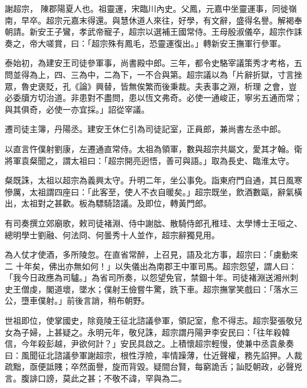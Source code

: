 
\begin{pinyinscope}

 謝超宗，
 陳郡陽夏人也。祖靈運，宋臨川內史。父鳳，元嘉中坐靈運事，同徙嶺南，早卒。超宗元嘉末得還。與慧休道人來往，好學，有文辭，盛得名譽。解褐奉朝請。新安王子鸞，孝武帝寵子，超宗以選補王國常侍。王母殷淑儀卒，超宗作誄奏之，帝大嗟賞，曰：「超宗殊有鳳毛，恐靈運復出。」轉新安王撫軍行參軍。



 泰始初，為建安王司徒參軍事，尚書殿中郎。三年，都令史駱宰議策秀才考格，五問並得為上，四、三為中，二為下，一不合與第。超宗議以為「片辭折獄，寸言挫眾，魯史褒貶，孔《論》興替，皆無俟繁而後秉裁。夫表事之淵，析理
 之會，豈必委牘方切治道。非患對不盡問，患以恆文弗奇。必使一通峻正，寧劣五通而常；與其俱奇，必使一亦宜採。」詔從宰議。



 遷司徒主簿，丹陽丞。建安王休仁引為司徒記室，正員郎，兼尚書左丞中郎。



 以直言忤僕射劉康，左遷通直常侍。太祖為領軍，數與超宗共屬文，愛其才翰。衛將軍袁粲聞之，謂太祖曰：「超宗開亮迥悟，善可與語。」取為長史、臨淮太守。



 粲既誅，太祖以超宗為義興太守。升明二年，坐公事免。詣東府門自通，其日風寒慘厲，太祖謂四座曰：「此客至，使人不衣自暖矣。」超宗既坐，飲酒數甌，辭氣橫出，太祖對之甚歡。板為驃騎諮議。及即位，轉黃門郎。



 有司奏撰立郊廟歌，敕司徒褚淵、侍中謝朏、散騎侍郎孔稚珪、太學博士王咺之、總明學士劉融、何法冏、何曇秀十人並作，超宗辭獨見用。



 為人仗才使酒，多所陵忽。在直省常醉，上召見，語及北方事，超宗曰：「虜動來二
 十年矣，佛出亦無如何！」以失儀出為南郡王中軍司馬。超宗怨望，謂人曰：「我今日政應為司驢。」為省司所奏，以怨望免官，禁錮十年。司徒褚淵送湘州刺史王僧虔，閣道壞，墜水；僕射王儉嘗牛驚，跣下車。超宗撫掌笑戲曰：「落水三公，墮車僕射。」前後言誚，稍布朝野。



 世祖即位，使掌國史，除竟陵王征北諮議參軍，領記室，愈不得志。超宗娶張敬兒女為子婦，上甚疑之。永明元年，敬兒誅，超宗謂丹陽尹李安民曰：「往年殺韓信，今年殺彭越，尹欲何計？」安民具啟之。上積懷超宗輕慢，使兼中丞袁彖奏曰：風聞征北諮議參軍謝超宗，根性浮險，率情躁薄，仕近聲權，務先諂狎。人裁疏黜，亟便詆賤；卒然面譽，旋而背毀。疑間台賢，每窮詭舌；訕貶朝政，必聲兇言。腹誹口謗，莫此之甚；不敬不諱，罕與為二。




\end{pinyinscope}
